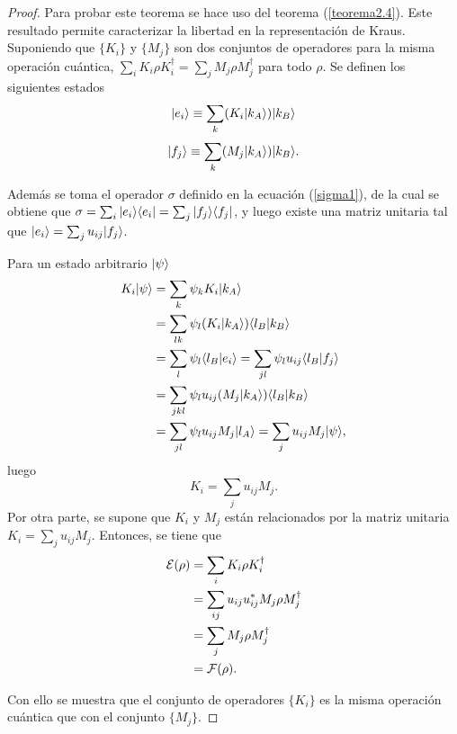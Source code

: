 \begin{proof}
Para probar este teorema se hace uso del teorema ({\ref{teorema2.4}}). Este resultado permite caracterizar la libertad en la representación de Kraus. Suponiendo que $\{K_i\}$ y $\{M_j\}$ son dos conjuntos de operadores para la misma operación cuántica, $\sum_i K_i \rho K_i^\dagger= \sum_j M_j \rho M_j^\dagger$ para todo $\rho$. Se definen los siguientes estados
\begin{equation}
    |e_i\rangle\equiv \sum_k (K_i|k_A\rangle)|k_B\rangle
\end{equation}
\begin{equation}
    |f_j\rangle\equiv \sum_k (M_j|k_A\rangle)|k_B\rangle.
\end{equation}


Además se toma el operador $\sigma$ definido en la ecuación ({\ref{sigma1}}), de la cual se obtiene que $\sigma=\sum_i|e_i \rangle \langle e_i|=\sum_j |f_j\rangle \langle f_j|$, y luego existe una matriz unitaria tal que $  |e_i\rangle=\sum_{j}u_{ij}|f_j\rangle$.

Para un estado arbitrario $|\psi\rangle$ 
\begin{equation}
    \begin{split}
        K_i|\psi\rangle&=\sum_k \psi_k K_i|k_A\rangle\\
                   &= \sum_{lk}\psi_l(K_i|k_A\rangle)\langle l_B |k_B\rangle\\
                   &=\sum_{l}\psi_l\langle l_B| e_i\rangle=\sum_{jl}\psi_l u_{ij}\langle l_B|f_j\rangle\\
                   &=\sum_{jkl}\psi_l u_{ij}(M_j|k_A\rangle)\langle l_B|k_B\rangle\\
                   &=\sum_{jl}\psi_l u_{ij}M_j|l_A\rangle=\sum_j u_{ij} M_j |\psi\rangle,\\
    \end{split}
\end{equation} luego \[K_i=\sum_j u_{ij}M_j.\]Por otra parte, se supone que $K_i$ y $M_j$ están relacionados por la matriz unitaria $K_i=\sum_j u_{ij}M_j$. Entonces, se tiene que
\begin{equation}
    \begin{split}
        \mathcal{E}(\rho)&=\sum_i  K_i\rho K_i^\dagger\\
            &=\sum_{ij} u_{ij}u_{ij}^*M_j\rho M_j^\dagger\\
            &=\sum_j M_j\rho M_j^\dagger\\
            &=\mathcal{F}(\rho).
    \end{split}
\end{equation}

Con ello se muestra que el conjunto de operadores $\{K_i\}$ es la misma operación cuántica que con el conjunto $\{M_j\}$.
\end{proof}

